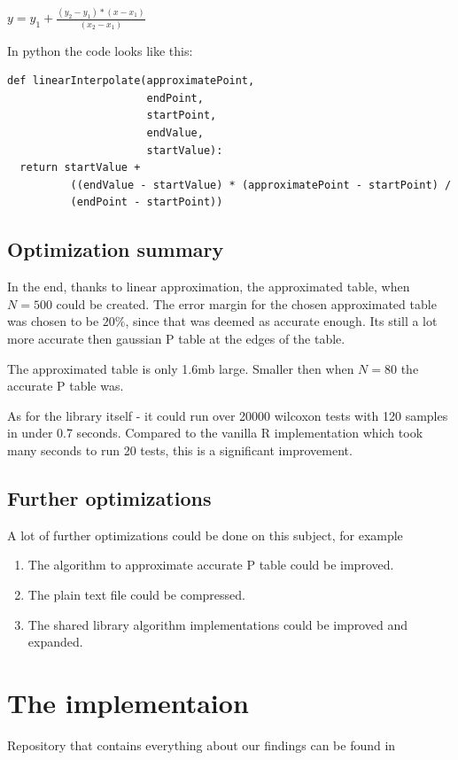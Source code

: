 \documentclass[12pt]{article}
\begin{document}
$y = y_1 + \frac{(y_2 - y_1) * (x - x_1)}{(x_2 - x_1)}$

In python the code looks like this:

\begin{verbatim}
def linearInterpolate(approximatePoint,
                      endPoint,
                      startPoint,
                      endValue,
                      startValue):
  return startValue +
          ((endValue - startValue) * (approximatePoint - startPoint) /
          (endPoint - startPoint))
\end{verbatim}

\subsection{Optimization summary}
In the end, thanks to linear approximation, the approximated table, when $N=500$ could be created. The error margin for the chosen approximated table was chosen to be $20\%$, since that was deemed as accurate enough. Its still a lot more accurate then gaussian P table at the edges of the table.

The approximated table is only 1.6mb large. Smaller then when $N=80$ the accurate P table was.

As for the library itself - it could run over 20000 wilcoxon tests with 120 samples in under 0.7 seconds. Compared to the vanilla R implementation which took many seconds to run 20 tests, this is a significant improvement.

\subsection{Further optimizations}
A lot of further optimizations could be done on this subject, for example

\begin{enumerate}
\item The algorithm to approximate accurate P table could be improved.
\item The plain text file could be compressed.
\item The shared library algorithm implementations could be improved and expanded.
\end{enumerate}

\newpage

\section{The implementaion}
Repository that contains everything about our findings can be found in
\end{document}
